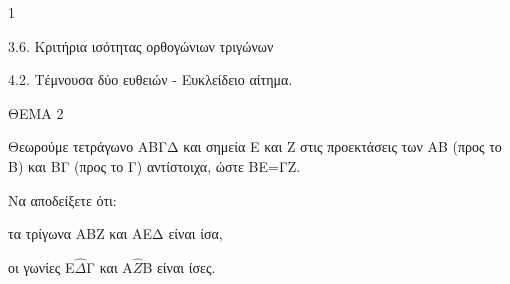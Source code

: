 \begin{ylh}{1}
    \item 3.6. Κριτήρια ισότητας ορθογώνιων τριγώνων
    \item 4.2. Τέμνουσα δύο ευθειών - Ευκλείδειο αίτημα.
\end{ylh}

ΘΕΜΑ 2

Θεωρούμε τετράγωνο ΑΒΓΔ και σημεία Ε και Ζ στις προεκτάσεις των ΑΒ (προς το Β) και ΒΓ (προς το Γ) αντίστοιχα, ώστε ΒΕ=ΓΖ.

Να αποδείξετε ότι:

\begin{alist}
\item τα τρίγωνα ΑΒΖ και ΑΕΔ είναι ίσα, 

\item οι γωνίες Ε$\widehat{\Delta}$Γ και Α$\widehat{Ζ}$Β είναι ίσες. 


\begin{center}
\end{center}
\end{alist}
